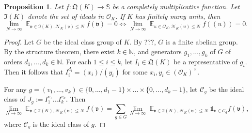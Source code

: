 \documentclass[11pt]{amsart}
\newtheorem{proposition}[lemma]{Proposition}
\theoremstyle{definition}
\DeclareMathOperator*{\E}{\mathbb{E}}
\newcommand{\N}{{\mathbb N}}
\newcommand{\NN}{{\mathcal N}}
\renewcommand{\S}{\mathbb{S}}
\begin{document}
\begin{proposition}
    Let $f\colon \mathfrak{Q}(K)\to\S$ be a completely multiplicative function. Let $\mathfrak{I}(K)$ denote the set of ideals in $\mathcal{O}_{K}$. If $K$ has finitely many units, then
    $$\lim_{N\to\infty} \E_{\mathfrak{v}\in \mathfrak{I}(K), \NN_{K}(\mathfrak{v})\leq N}f(\mathfrak{v})=0 \Leftrightarrow \lim_{N\to\infty} \E_{u\in\mathcal{O}_{K}, \NN_{K}(u)\leq N}f((u))=0.$$
\end{proposition}
\begin{proof}

 


 Let $G$ be the ideal class group of $K$. By ???, $G$ is a finite abelian group. By the structure theorem, there exist $k\in\N$, 
    and generators $g_{1},\dots,g_{k}$ of $G$ of orders $d_{1},\dots,d_{k}\in\N$.
    For each $1\leq i\leq k$, let $I_{i}\in \mathfrak{Q}(K)$ be a representative of $g_{i}$. Then it follows that $I_{i}^{d_{i}}=(x_{i})/(y_{i})$ for some $x_{i},y_{i}\in (\mathcal{O}_{K})^{\times}$. 

   For any $g=(v_{1},\dots,v_{k})\in \{0,\dots,d_{1}-1\}\times\dots\times\{0,\dots,d_{k}-1\}$, let $\mathcal{C}_{g}$ be the ideal class of $J_{g}:=I_{1}^{v_{1}}\dots I_{k}^{v_{k}}$. Then 
   $$\lim_{N\to\infty} \E_{\mathfrak{v}\in \mathfrak{I}(K), \NN_{K}(\mathfrak{v})\leq N}f(\mathfrak{v})=\sum_{g\in G}\lim_{N\to\infty} \E_{\mathfrak{v}\in \mathfrak{I}(K), \NN_{K}(\mathfrak{v})\leq N}\mathds{1}_{\mathfrak{v}\in \mathcal{C}_{g}}f(\mathfrak{v}),$$
where $\mathcal{C}_{g}$ is the ideal class of $g$.


\end{proof}
\end{document}
